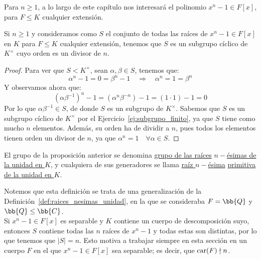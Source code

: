 Para $n\geq 1$, a lo largo de este capítulo nos interesará el polinomio $x^n-1\in F[x]$, para $F\leq K$ cualquier extensión.
\begin{prop}
    Si $n\geq 1$ y consideramos como $S$ el conjunto de todas las raíces de $x^n-1\in F[x]$ en $K$ para $F\leq K$ cualquier extensión, tenemos que $S$ es un subgrupo cíclico de $K^\times$ cuyo orden es un divisor de $n$.
    \begin{proof}
        Para ver que $S<K^\times$, sean $\alpha,\beta\in S$, tenemos que:
        \begin{equation*}
            \alpha^n - 1 = 0 = \beta^n -1 \quad \Longrightarrow \quad  \alpha^n = 1 = \beta^n
        \end{equation*}
        Y observamos ahora que:
        \begin{equation*}
            {(\alpha\beta^{-1})}^{n} -1  = (\alpha^n \beta^{-n})-1 = (1\cdot 1) - 1 = 0
        \end{equation*}
        Por lo que $\alpha\beta^{-1}\in S$, de donde $S$ es un subgrupo de $K^\times$. Sabemos que $S$ es un subgrupo cíclico de $K^\times$ por el Ejercicio~\ref{ej:subgrupo_finito}, ya que $S$ tiene como mucho $n$ elementos. Además, su orden ha de dividir a $n$, pues todos los elementos tienen orden un divisor de $n$, ya que $\alpha^n = 1 \quad \forall \alpha\in S$.
    \end{proof}
\end{prop} 

\begin{definicion}\label{def:raices_nesimas_unidad_K}
    El grupo de la proposición anterior se denomina \ul{grupo de las raíces} \ul{$n-$ésimas de la unidad en $K$}, y cualquiera de sus generadores se llama \ul{raíz $n-$ésima} \ul{primitiva de la unidad en $K$}.
\end{definicion}

Notemos que esta definición se trata de una generalización de la Definición~\ref{def:raices_nesimas_unidad}, en la que se consideraba $F=\bb{Q}$ y $\bb{Q}\leq \bb{C}$.\\


Si $x^n-1\in F[x]$ es separable y $K$ contiene un cuerpo de descomposición suyo, entonces $S$ contiene todas las $n$ raíces de $x^n-1$ y todas estas son distintas, por lo que tenemos que $|S| = n$. Esto motiva a trabajar siempre en esta sección en un cuerpo $F$ en el que $x^n-1\in F[x]$ sea separable; es decir, que $\operatorname{car}(F)\nmid n$.

